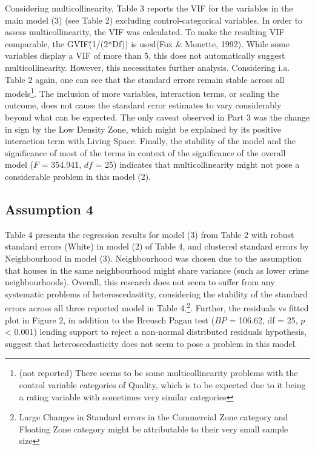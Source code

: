 \documentclass[a4paper]{article}
\begin{document}
Considering multicollinearity, Table 3 reports the VIF for the variables in the main model (3) (see Table 2) excluding control-categorical variables. In order to assess multicollinearity, the VIF was calculated. To make the resulting VIF comparable, the GVIF\^(1/(2*Df)) is used(Fox \& Monette, 1992). While some variables display a VIF of more than 5, this does not automatically suggest multicollinearity. However, this necessitates further analysis. Considering i.a. Table 2 again, one can see that the standard errors remain stable across all models\footnote{(not reported) There seems to be some multicollinearity problems with the control variable categories of Quality, which is to be expected due to it being a rating variable with sometimes very similar categories}. The inclusion of more variables, interaction terms, or scaling the outcome, does not cause the standard error estimates to vary considerably beyond what can be expected. The only caveat observed in Part 3 was the change in sign by the Low Density Zone, which might be explained by its positive interaction term with Living Space. Finally, the stability of the model and the significance of most of the terms in context of the significance of the overall model ($F$ = 354.941, $df$ = 25) indicates that multicollinearity might not pose a considerable problem in this model (2).


\subsection{Assumption 4}
Table 4 presents the regression results for model (3) from Table 2 with robust standard errors (White) in model (2) of Table 4, and clustered standard errors by Neighbourhood in model (3). Neighbourhood was chosen due to the assumption that houses in the same neighbourhood might share variance (such as lower crime neighbourhoods). Overall, this research does not seem to suffer from any systematic problems of heteroscedasitity, considering the stability of the standard errors across all three reported model in Table 4.\footnote{Large Changes in Standard errors in the Commercial Zone category and Floating Zone category might be attributable to their very small sample size}. Further, the residuals vs fitted plot in Figure 2, in addition to the Breusch Pagan test ($BP$ = 106.62, df = 25, $p$ < 0.001) lending support to reject a non-normal distributed residuals hypothesis, suggest that heteroscedasticity does not seem to pose a problem in this model. 


\end{document}
